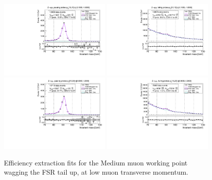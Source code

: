 \begin{figure}
\centering
\includegraphics[width=0.49\textwidth]{figures/Zmm_WagFsrUp_BkgLPi_pass_ptBin0_etaBin1.pdf}
\includegraphics[width=0.49\textwidth]{figures/Zmm_WagFsrUp_BkgLPi_fail_ptBin0_etaBin1.pdf}
\includegraphics[width=0.49\textwidth]{figures/Zmm_WagFsrUp_BkgLPi_pass_ptBin1_etaBin9.pdf}
\includegraphics[width=0.49\textwidth]{figures/Zmm_WagFsrUp_BkgLPi_fail_ptBin1_etaBin9.pdf}
\caption{Efficiency extraction fits for the Medium muon working point wagging the FSR tail up, at low muon transverse momentum.}
\label{fig:ZmmAltSigFSRFits1}
\end{figure}
